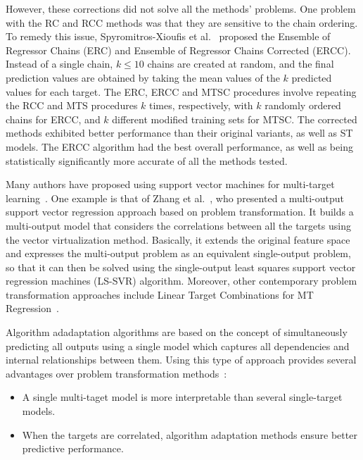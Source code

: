 \documentclass[reqno]{vcuthesis}
\newcommand{\iitem}{\item[-]}
\numberwithin{equation}{chapter}
\begin{document}
However, these corrections did not solve all the methods' problems. One problem with the RC and RCC methods was that they are sensitive to the chain ordering. To remedy this issue, Spyromitros-Xioufis et al.~\cite{Spyromitros2014} proposed the Ensemble of Regressor Chains (ERC) and Ensemble of Regressor Chains Corrected (ERCC). Instead of a single chain, $k \leq 10$ chains are created at random, and the final prediction values are obtained by taking the mean values of the $k$ predicted values for each target. The ERC, ERCC and MTSC procedures involve repeating the RCC and MTS procedures $k$ times, respectively, with $k$ randomly ordered chains for ERCC, and $k$ different modified training sets for MTSC. The corrected methods exhibited better performance than their original variants, as well as ST models. The ERCC algorithm had the best overall performance, as well as being statistically significantly more accurate of all the methods tested\cite{Spyromitros2014}.

Many authors have proposed using support vector machines for multi-target learning~\cite{Borchani2015,Xiong2014,Xu2013}. One example is that of Zhang et al.~\cite{Zhang2012}, who presented a multi-output support vector regression approach based on problem transformation. It builds a multi-output model that considers the correlations between all the targets using the vector virtualization method. Basically, it extends the original feature space and expresses the multi-output problem as an equivalent single-output problem, so that it can then be solved using the single-output least squares support vector regression machines (LS-SVR) algorithm. Moreover, other contemporary problem transformation approaches include Linear Target Combinations for MT Regression~\cite{Tsoumakas2014}.

Algorithm adadaptation algorithms are based on the concept of simultaneously predicting all outputs using a single model which captures all dependencies and internal relationships between them. Using this type of approach provides several advantages over problem transformation methods~\cite{breiman1997predicting,kocev2009using,simila2007input}:
\begin{itemize}
\iitem A single multi-taget model is more interpretable than several single-target models.
\iitem When the targets are correlated, algorithm adaptation methods ensure better predictive performance.
\end{itemize}
\end{document}
